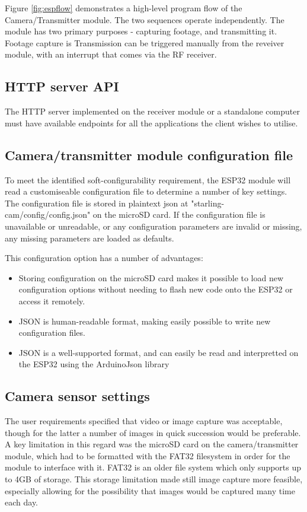 Figure \ref{fig:espflow} demonstrates a high-level program flow of the Camera/Transmitter module. The two sequences operate independently. The module has two primary purposes - capturing footage, and transmitting it. Footage capture is Transmission can be triggered manually from the reveiver module, with an interrupt that comes via the RF receiver. 

\subsection{HTTP server API}

The HTTP server implemented on the receiver module or a standalone computer must have available endpoints for all the applications the client wishes to utilise.

\subsection{Camera/transmitter module configuration file}

To meet the identified soft-configurability requirement, the ESP32 module will read a customiseable configuration file to determine a number of key settings. The configuration file is stored in plaintext json at "starling-cam/config/config.json" on the microSD card. If the configuration file is unavailable or unreadable, or any configuration parameters are invalid or missing, any missing parameters are loaded as defaults.

This configuration option has a number of advantages:

\begin{itemize}
    \item Storing configuration on the microSD card makes it possible to load new configuration options without needing to flash new code onto the ESP32 or access it remotely.
    \item JSON is human-readable format, making easily possible to write new configuration files.
    \item JSON is a well-supported format, and can easily be read and interpretted on the ESP32 using the ArduinoJson library %
\end{itemize}

\subsection{Camera sensor settings}

The user requirements specified that video or image capture was acceptable, though for the latter a number of images in quick succession would be preferable. A key limitation in this regard was the microSD card on the camera/transmitter module, which had to be formatted with the FAT32 filesystem in order for the module to interface with it. FAT32 is an older file system which only supports up to 4GB of storage. This storage limitation made still image capture more feasible, especially allowing for the possibility that images would be captured many time each day.

